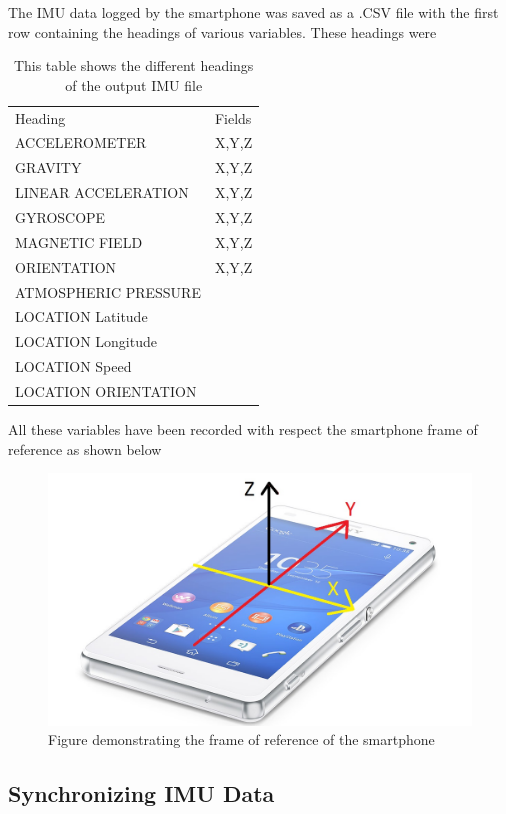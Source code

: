 The IMU data logged by the smartphone was saved as a .CSV file with the first row containing the headings of various variables. These headings were

\begin{table}
\centering
\caption{This table shows the different headings of the output IMU file}
\label{IMU Headings}
\begin{tabular}{ll}
Heading               & Fields  \\
ACCELEROMETER       & X,Y,Z  \\
GRAVITY              & X,Y,Z \\
LINEAR ACCELERATION  & X,Y,Z\\
GYROSCOPE            & X,Y,Z \\
MAGNETIC FIELD       &  X,Y,Z\\
ORIENTATION          &  X,Y,Z\\
ATMOSPHERIC PRESSURE  &  \\
LOCATION Latitude     &  \\
LOCATION Longitude    &  \\
LOCATION Speed        &  \\
LOCATION ORIENTATION  & 
\end{tabular}
\end{table}

All these variables have been recorded with respect the smartphone frame of reference as shown below
\begin{figure}[!ht] 
\captionsetup{width=\linewidth, font=small}  
\includegraphics[width=\linewidth]{figures/phone.jpg}
\caption{Figure demonstrating the frame of reference of the smartphone}
\label{fig:phone}
\end{figure}

\subsection{Synchronizing IMU Data}

